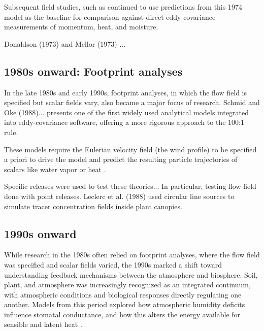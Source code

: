 \documentclass{article}
\begin{document}
    Subsequent field studies, such as \citet{baldocchi_intra-field_1995} continued to use predictions from this 1974 model as the baseline for comparison against direct eddy-covariance measurements of momentum, heat, and moisture.
    
     Donaldson (1973) and Mellor (1973) ...  
    
    \subsection*{1980s onward:  Footprint analyses}
    
    In the late 1980s and early 1990s, footprint analyses, in which the flow field is specified but scalar fields vary, also became a major focus of research.
    Schmid and Oke (1988)...
    \citet{schuepp1990footprint} presents one of the first widely used analytical models integrated into eddy-covariance software, offering a more rigorous approach to the 100:1 rule.
    
    These models require the Eulerian velocity field (the wind profile) to be specified a priori to drive the model and predict the resulting particle trajectories of scalars like water vapor or heat \cite{hsieh_lagrangian_1997}.
    
    Specific releases were used to test these theories...  
    In particular, testing flow field done with point releases.
    Leclerc et al. (1988) used circular line sources to simulate tracer concentration fields inside plant canopies. 
    
    \subsection*{1990s onward}
    
     While research in the 1980s often relied on footprint analyses,  where the flow field was specified and scalar fields varied, the 1990s marked a shift toward understanding  feedback mechanisms between  the atmosphere and  biosphere.
     Soil, plant, and atmosphere was increasingly recognized as an integrated continuum, with atmospheric conditions and biological responses directly regulating one another.
     Models from this period 
     explored how atmospheric humidity deficits influence stomatal conductance, and how this alters the energy available for sensible and latent heat \cite{baldocchi1995intra}.
     
\end{document}

